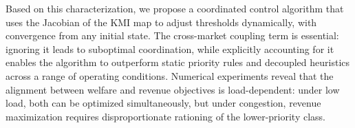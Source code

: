 \documentclass[opre,sglanonrev]{informs4}
\begin{document}
{Based on this characterization, we propose a coordinated control algorithm that uses the Jacobian of the KMI map to adjust thresholds dynamically, with convergence from any initial state.
The cross-market coupling term is essential: ignoring it leads to suboptimal coordination, while explicitly accounting for it enables the algorithm to outperform static priority rules and decoupled heuristics across a range of operating conditions.
Numerical experiments reveal that the alignment between welfare and revenue objectives is load-dependent: under low load, both can be optimized simultaneously, but under congestion, revenue maximization requires disproportionate rationing of the lower-priority class.
}%






\maketitle






\ECSwitch

\end{document}
